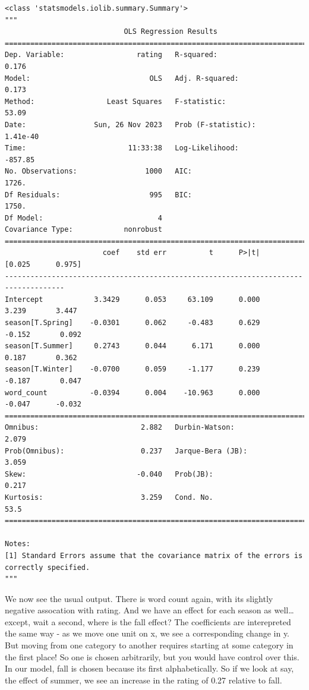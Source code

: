 \documentclass[
  letterpaper,
]{krantz}
\begin{document}
\begin{verbatim}
<class 'statsmodels.iolib.summary.Summary'>
"""
                            OLS Regression Results                            
==============================================================================
Dep. Variable:                 rating   R-squared:                       0.176
Model:                            OLS   Adj. R-squared:                  0.173
Method:                 Least Squares   F-statistic:                     53.09
Date:                Sun, 26 Nov 2023   Prob (F-statistic):           1.41e-40
Time:                        11:33:38   Log-Likelihood:                -857.85
No. Observations:                1000   AIC:                             1726.
Df Residuals:                     995   BIC:                             1750.
Df Model:                           4                                         
Covariance Type:            nonrobust                                         
====================================================================================
                       coef    std err          t      P>|t|      [0.025      0.975]
------------------------------------------------------------------------------------
Intercept            3.3429      0.053     63.109      0.000       3.239       3.447
season[T.Spring]    -0.0301      0.062     -0.483      0.629      -0.152       0.092
season[T.Summer]     0.2743      0.044      6.171      0.000       0.187       0.362
season[T.Winter]    -0.0700      0.059     -1.177      0.239      -0.187       0.047
word_count          -0.0394      0.004    -10.963      0.000      -0.047      -0.032
==============================================================================
Omnibus:                        2.882   Durbin-Watson:                   2.079
Prob(Omnibus):                  0.237   Jarque-Bera (JB):                3.059
Skew:                          -0.040   Prob(JB):                        0.217
Kurtosis:                       3.259   Cond. No.                         53.5
==============================================================================

Notes:
[1] Standard Errors assume that the covariance matrix of the errors is correctly specified.
"""
\end{verbatim}

We now see the usual output. There is word count again, with its
slightly negative assocation with rating. And we have an effect for each
season as well\ldots{} except, wait a second, where is the fall effect?
The coefficients are interepreted the same way - as we move one unit on
x, we see a corresponding change in y. But moving from one category to
another requires starting at some category in the first place! So one is
chosen arbitrarily, but you would have control over this. In our model,
fall is chosen because its first alphabetically. So if we look at say,
the effect of summer, we see an increase in the rating of 0.27 relative
to fall.
\end{document}
